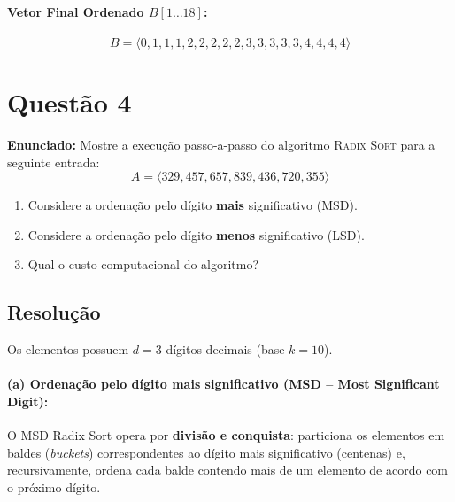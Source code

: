 \documentclass[11pt,a4paper]{article}
\begin{document}
\paragraph{Vetor Final Ordenado $B[1 \dots 18]$:}
\[
B = \langle 0, 1, 1, 1, 2, 2, 2, 2, 2, 3, 3, 3, 3, 3, 4, 4, 4, 4 \rangle
\]

\vspace{0.2cm}

\section*{Questão 4}
\textbf{Enunciado:} Mostre a execução passo-a-passo do algoritmo \textsc{Radix Sort} para a seguinte entrada:
\[
A = \langle 329, 457, 657, 839, 436, 720, 355 \rangle
\]
\begin{enumerate}
    \item[(a)] Considere a ordenação pelo dígito \textbf{mais} significativo (MSD).
    \item[(b)] Considere a ordenação pelo dígito \textbf{menos} significativo (LSD).
    \item[(c)] Qual o custo computacional do algoritmo?
\end{enumerate}

\subsection*{Resolução}
Os elementos possuem $d = 3$ dígitos decimais (base $k = 10$).

\paragraph{(a) Ordenação pelo dígito mais significativo (MSD -- Most Significant Digit):}
O MSD Radix Sort opera por \textbf{divisão e conquista}: particiona os elementos em baldes (\emph{buckets}) correspondentes ao dígito mais significativo (centenas) e, recursivamente, ordena cada balde contendo mais de um elemento de acordo com o próximo dígito.
\end{document}
